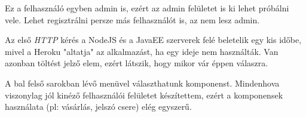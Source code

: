 \documentclass[]{article}
\begin{document}
Ez a felhasználó egyben admin is, ezért az admin felületet is ki lehet próbálni vele. Lehet regisztrálni persze más felhasználót is, az nem lesz admin.

Az első \textit{HTTP} kérés a NodeJS és a JavaEE szerverek felé beletelik egy kis időbe, mivel a Heroku "altatja" az alkalmazást, ha egy ideje nem használták. Van azonban töltést jelző elem, ezért látszik, hogy mikor vár éppen válaszra.

A bal felső sarokban lévő menüvel választhatunk komponenst. Mindenhova viszonylag jól kinéző felhasználói felületet készítettem, ezért a komponensek használata (pl: vásárlás, jelszó csere) elég egyszerű.
\end{document}
